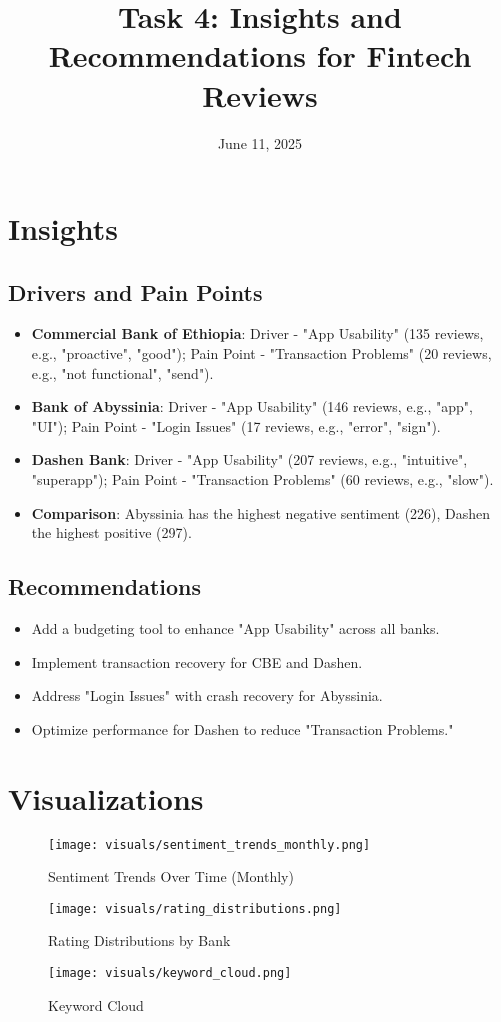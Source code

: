 \documentclass[a4paper,12pt]{article}
\title{Task 4: Insights and Recommendations for Fintech Reviews}
\author{}
\date{June 11, 2025}
\begin{document}
\maketitle

\section{Insights}
\subsection{Drivers and Pain Points}
\begin{itemize}
  \item \textbf{Commercial Bank of Ethiopia}: Driver - "App Usability" (135 reviews, e.g., "proactive", "good"); Pain Point - "Transaction Problems" (20 reviews, e.g., "not functional", "send").
  \item \textbf{Bank of Abyssinia}: Driver - "App Usability" (146 reviews, e.g., "app", "UI"); Pain Point - "Login Issues" (17 reviews, e.g., "error", "sign").
  \item \textbf{Dashen Bank}: Driver - "App Usability" (207 reviews, e.g., "intuitive", "superapp"); Pain Point - "Transaction Problems" (60 reviews, e.g., "slow").
  \item \textbf{Comparison}: Abyssinia has the highest negative sentiment (226), Dashen the highest positive (297).
\end{itemize}

\subsection{Recommendations}
\begin{itemize}
  \item Add a budgeting tool to enhance "App Usability" across all banks.
  \item Implement transaction recovery for CBE and Dashen.
  \item Address "Login Issues" with crash recovery for Abyssinia.
  \item Optimize performance for Dashen to reduce "Transaction Problems."
\end{itemize}

\section{Visualizations}
\begin{figure}[h]
  \centering
  \texttt{[image: visuals/sentiment\_trends\_monthly.png]}
  \caption{Sentiment Trends Over Time (Monthly)}
\end{figure}
\begin{figure}[h]
  \centering
  \texttt{[image: visuals/rating\_distributions.png]}
  \caption{Rating Distributions by Bank}
\end{figure}
\begin{figure}[h]
  \centering
  \texttt{[image: visuals/keyword\_cloud.png]}
  \caption{Keyword Cloud}
\end{figure}
\end{document}
